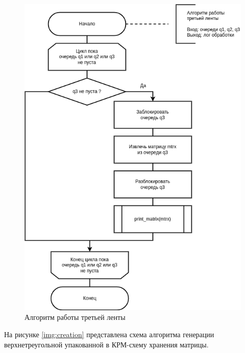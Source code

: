 \begin{figure}[H]
	\begin{center}
		\includegraphics[scale=0.7]{img/third.png}
	\end{center}
	\captionsetup{justification=centering}
	\caption{Алгоритм работы третьей ленты}
	\label{img:third}
\end{figure}

На рисунке \ref{img:creation} представлена схема алгоритма генерации верхнетреугольной упакованной в КРМ-схему хранения матрицы.

